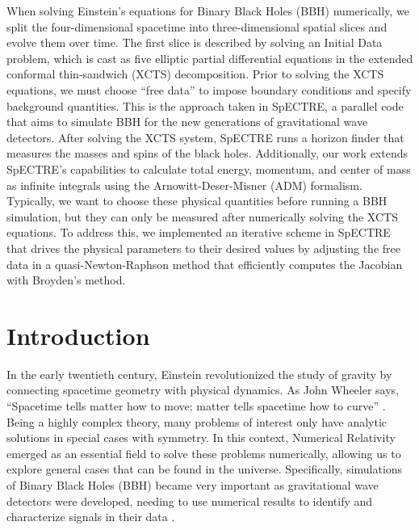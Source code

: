 \documentclass{../document}
\begin{document}
    When solving Einstein's equations for Binary Black Holes (BBH) numerically, we split the four-dimensional spacetime into three-dimensional spatial slices and evolve them over time. The first slice is described by solving an Initial Data problem, which is cast as five elliptic partial differential equations in the extended conformal thin-sandwich (XCTS) decomposition. Prior to solving the XCTS equations, we must choose ``free data'' to impose boundary conditions and specify background quantities. This is the approach taken in SpECTRE, a parallel code that aims to simulate BBH for the new generations of gravitational wave detectors. After solving the XCTS system, SpECTRE runs a horizon finder that measures the masses and spins of the black holes. Additionally, our work extends SpECTRE's capabilities to calculate total energy, momentum, and center of mass as infinite integrals using the Arnowitt-Deser-Misner (ADM) formalism. Typically, we want to choose these physical quantities before running a BBH simulation, but they can only be measured after numerically solving the XCTS equations. To address this, we implemented an iterative scheme in SpECTRE that drives the physical parameters to their desired values by adjusting the free data in a quasi-Newton-Raphson method that efficiently computes the Jacobian with Broyden's method.

  \section{Introduction}
    
    In the early twentieth century, Einstein revolutionized the study of gravity by connecting spacetime geometry with physical dynamics. As John Wheeler says, ``Spacetime tells matter how to move; matter tells spacetime how to curve'' \cite{Wheeler}. Being a highly complex theory, many problems of interest only have analytic solutions in special cases with symmetry. In this context, Numerical Relativity emerged as an essential field to solve these problems numerically, allowing us to explore general cases that can be found in the universe. Specifically, simulations of Binary Black Holes (BBH) became very important as gravitational wave detectors were developed, needing to use numerical results to identify and characterize signals in their data \cite{LIGO}.
\end{document}
